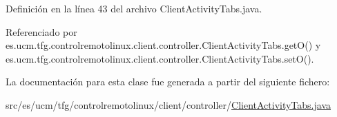 Definición en la línea 43 del archivo Client\-Activity\-Tabs.\-java.



Referenciado por es.\-ucm.\-tfg.\-controlremotolinux.\-client.\-controller.\-Client\-Activity\-Tabs.\-get\-O() y es.\-ucm.\-tfg.\-controlremotolinux.\-client.\-controller.\-Client\-Activity\-Tabs.\-set\-O().



La documentación para esta clase fue generada a partir del siguiente fichero\-:\begin{DoxyCompactItemize}
\item 
src/es/ucm/tfg/controlremotolinux/client/controller/\hyperlink{ClientActivityTabs_8java}{Client\-Activity\-Tabs.\-java}\end{DoxyCompactItemize}
